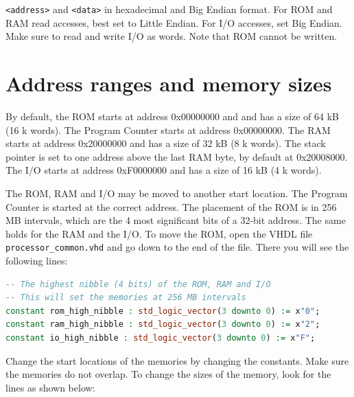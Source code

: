 \documentclass[12pt]{article}
\begin{document}
\texttt{<address>} and \texttt{<data>} in hexadecimal and Big Endian format. For ROM and RAM read accesses, best set to Little Endian. For I/O accesses, set Big Endian. Make sure to read and write I/O as words. Note that ROM cannot be written.

\section{Address ranges and memory sizes}
By default, the ROM starts at address 0x00000000 and and has a size of 64 kB (16 k words). The Program Counter starts at address 0x00000000. The RAM starts at address 0x20000000 and has a size of 32 kB (8 k words). The stack pointer is set to one address above the last RAM byte, by default at 0x20008000. The I/O starts at address 0xF0000000 and has a size of 16 kB (4 k words).

The ROM, RAM and I/O may be moved to another start location. The Program Counter is started at the correct address. The placement of the ROM is in 256 MB intervals, which are the 4 most significant bits of a 32-bit address. The same holds for the RAM and the I/O. To move the ROM, open the VHDL file \lstinline|processor_common.vhd| and go down to the end of the file. There you will see the following lines:

\begin{lstlisting}[language=VHDL]
-- The highest nibble (4 bits) of the ROM, RAM and I/O
-- This will set the memories at 256 MB intervals
constant rom_high_nibble : std_logic_vector(3 downto 0) := x"0";
constant ram_high_nibble : std_logic_vector(3 downto 0) := x"2";
constant io_high_nibble : std_logic_vector(3 downto 0) := x"F";
\end{lstlisting}

Change the start locations of the memories by changing the constants. Make sure the memories do not overlap. To change the sizes of the memory, look for the lines as shown below:
\end{document}
